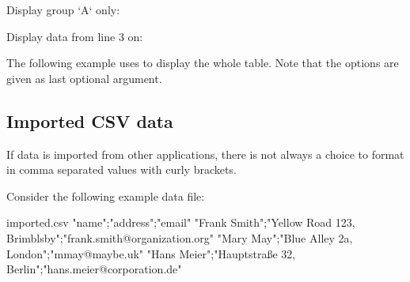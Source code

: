 \documentclass[a4paper,11pt]{ltxdoc}
\begin{document}
\begin{dispExample}
Display group `A` only:\par
{}
\end{dispExample}


\begin{dispExample}
Display data from line 3 on:\par
{}
\end{dispExample}


\clearpage

The following example uses  to display the whole
table. Note that the  options are given as last
optional argument.




\clearpage
\subsection{Imported CSV data}\label{sec:importeddata}%
If data is imported from other applications, there is not always a choice
to format in comma separated values with curly brackets.

Consider the following example data file:

\begin{tcbverbatimwrite}{imported.csv}
"name";"address";"email"
"Frank Smith";"Yellow Road 123, Brimblsby";"frank.smith@organization.org"
"Mary May";"Blue Alley 2a, London";"mmay@maybe.uk"
"Hans Meier";"Hauptstraße 32, Berlin";"hans.meier@corporation.de"
\end{tcbverbatimwrite}
\end{document}
